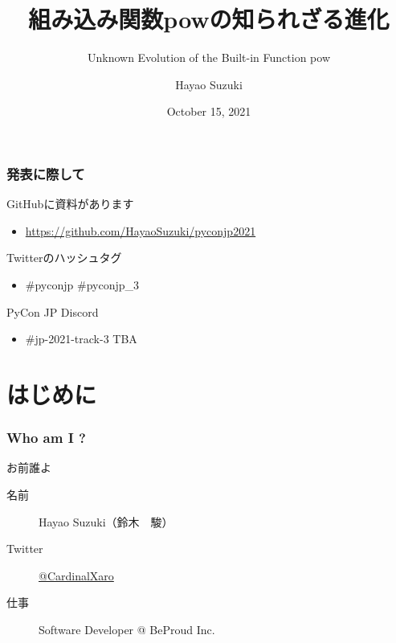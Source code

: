 \documentclass[aspectratio=169,dvipdfmx,14pt,notheorems]{beamer}
\title{組み込み関数powの知られざる進化}
\subtitle{Unknown Evolution of the Built-in Function pow}
\author[Hayao]{Hayao Suzuki}
\institute[PyCon JP 2021]{PyCon JP 2021}
\date{October 15, 2021}
\theoremstyle{definition}
\begin{document}
\begin{frame}[plain]\frametitle{}
\titlepage %
\end{frame}

\begin{frame}\frametitle{発表に際して}

\begin{block}{GitHubに資料があります}
\begin{itemize}
\item \url{https://github.com/HayaoSuzuki/pyconjp2021}
\end{itemize}
\end{block}

\begin{block}{Twitterのハッシュタグ}
\begin{itemize}
\item \#pyconjp \#pyconjp\_3
\end{itemize}
\end{block}

\begin{block}{PyCon JP Discord}
\begin{itemize}
\item \#jp-2021-track-3 TBA
\end{itemize}
\end{block}
\end{frame}

\section{はじめに}

\begin{frame}\frametitle{Who am I ?}

\begin{block}{お前誰よ}
\begin{description}
\item[名前] Hayao Suzuki（鈴木　駿）
\item[Twitter] \href{https://twitter.com/CardinalXaro}{@CardinalXaro}
\item[仕事] Software Developer @ BeProud Inc.
\end{description}
\end{block}


\end{frame}
\end{document}
